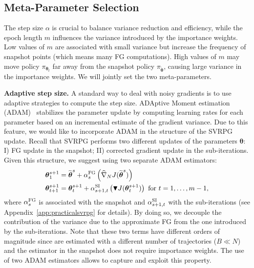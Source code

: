 \documentclass{article}
\theoremstyle{remark}
\theoremstyle{definition}
\newcommand{\vtheta}{\boldsymbol{\theta}}
\newcommand{\wt}[1]{\widetilde{#1}}
\newcommand{\wh}[1]{\widehat{#1}}
\begin{document}
\subsection{Meta-Parameter Selection}\label{sec:stopping}
\vspace{-0.05in}
The step size $\alpha$ is crucial to balance variance reduction and efficiency, while
the epoch length $m$ influences the variance introduced by the importance weights. Low values of $m$ are associated with small variance but increase the frequency of snapshot points (which means many FG computations). High values of $m$ may move policy $\pi_{\vtheta_t}$ far away from the snapshot policy $\pi_{\wt{\vtheta}}$, causing large variance in the importance weights. We will jointly set the two meta-parameters.

\textbf{Adaptive step size.}
A standard way to deal with noisy gradients is to use adaptive strategies to compute the step size.
ADAptive Moment estimation (ADAM)~\citep{kingma2014adam} stabilizes the parameter update by computing learning rates for each parameter based on an incremental estimate of the gradient variance.
Due to this feature, we would like to incorporate ADAM in the structure of the SVRPG update.
Recall that SVRPG performs two different updates of the parameters $\vtheta$: I) FG update in the snapshot; II) corrected gradient update in the sub-iterations.
Given this structure, we suggest using two separate ADAM estimators:
\begin{align*}
        \vtheta^{s+1}_1 &= \wt{\vtheta}^s + \alpha^{\textsc{FG}}_s\left(\wh{\nabla}_N J(\wt{\vtheta}^s) \right)\\
        \vtheta^{s+1}_{t+1} &= \vtheta^{s+1}_t + \alpha^{\textsc{SI}}_{s+1,t}\left( 
        \blacktriangledown J(\vtheta^{s+1}_t)\right)
        \text{ for $t=1,\dots,m-1$},
\end{align*}
where $\alpha^{\textsc{FG}}_{s}$ is associated with the snapshot and $\alpha^{\textsc{SI}}_{s+1,t}$ with the sub-iterations (see Appendix~\ref{app:practicalsvrpg} for details).
By doing so, we decouple the contribution of the variance due to the approximate FG from the one introduced by the sub-iterations.
Note that these two terms have different orders of magnitude since are estimated with a different number of trajectories ($B \ll N$) and the estimator in the snapshot does not require importance weights.
The use of two ADAM estimators allows to capture and exploit this property.
\end{document}
